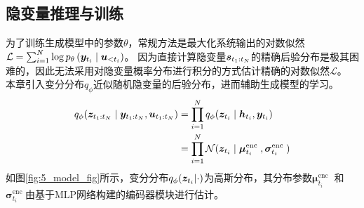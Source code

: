 \subsection{隐变量推理与训练}
为了训练生成模型中的参数$\theta$，常规方法是最大化系统输出的对数似然$\mathcal{L}=\sum_{i=1}^N\log p_{\theta}\left( \boldsymbol{y}_{t_i} \mid  \boldsymbol u_{<t_i}  \right)$。
因为直接计算隐变量$\boldsymbol{s}_{t_1:t_N}$的精确后验分布是极其困难的，因此无法采用对隐变量概率分布进行积分的方式估计精确的对数似然$\mathcal{L}$。
本章引入变分分布$q_\phi$近似随机隐变量的后验分布，进而辅助生成模型的学习。
\begin{equation}
\begin{aligned}
 q_{\phi}(\boldsymbol z_{t_1:t_N}\mid\boldsymbol y_{t_1:t_N},\boldsymbol u_{t_1:t_N}) &= \prod_{i=1}^{N} q_{\phi}(\boldsymbol z_{t_i}\mid \boldsymbol{h}_{t_i},\boldsymbol{y}_{t_i})\\
 &= \prod_{i=1}^{N} \mathcal{N}(\boldsymbol{z}_{t_i}\mid\boldsymbol{\mu}_{t_i}^{\text {enc }}, \boldsymbol{\sigma}_{t_i}^{\text {enc }})  
 \label{equ:posterior_z}
\end{aligned}
\end{equation}
如图\ref{fig:5_model_fig}所示，变分分布$q_\phi(\boldsymbol{z}_{t_i}|\cdot)$为高斯分布，其分布参数$\boldsymbol{\mu}_{t_i}^{\text {enc }}$ 和 $\boldsymbol{\sigma}_{t_i}^{\text {enc }}$由基于MLP网络构建的编码器模块进行估计。
